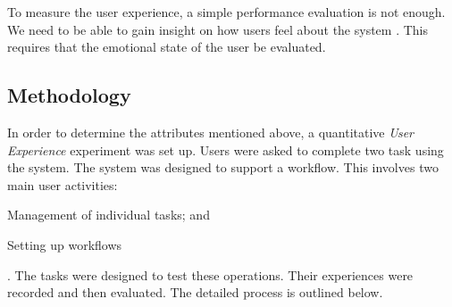 \documentclass[12pt,a4paper]{report}
\begin{document}
To measure the user experience, a simple performance evaluation is not
enough. We need to be able to gain insight on how users feel about the system
\cite{vermeeren2010user}. This requires that the emotional state of the user be
evaluated.

\subsection{Methodology}
In order to determine the attributes mentioned above, a quantitative \emph{User Experience}
 experiment was set up. Users were asked to complete two task using
the system. The system was designed to support a workflow. This involves two main
user activities: \begin{inparaenum}[(i)] \item Management of individual tasks;
and \item Setting up workflows \end{inparaenum}. The tasks were designed to test
these operations. Their experiences were recorded and then evaluated. The detailed
process is outlined below.
\end{document}
